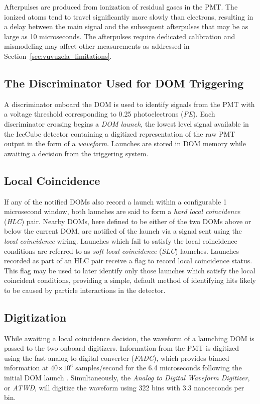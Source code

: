 Afterpulses are produced from ionization of residual gases in the PMT.
The ionized atoms tend to travel significantly more slowly than electrons, resulting in a delay between the main signal and the subsequent afterpulses that may be as large as 10 microseconds.
The afterpulses require dedicated calibration and mismodeling may affect other measurements as addressed in Section~\ref{sec:vuvuzela_limitations}.

\subsection{The Discriminator Used for DOM Triggering}
\label{ubsec:discriminator}
A discriminator onboard the DOM is used to identify signals from the PMT with a voltage threshold corresponding to 0.25 photoelectrons (\emph{PE}).
Each discriminator crossing begins a \emph{DOM launch}, the lowest level signal available in the IceCube detector containing a digitized representation of the raw PMT output in the form of a \emph{waveform}.
Launches are stored in DOM memory while awaiting a decision from the triggering system.

\subsection{Local Coincidence}
\label{subsec:LC}
If any of the notified DOMs also record a launch within a configurable 1 microsecond window, both launches are said to form a \emph{hard local coincidence} (\emph{HLC}) pair.
Nearby DOMs, here defined to be either of the two DOMs above or below the current DOM, are notified of the launch via a signal sent using the \emph{local coincidence} wiring.
Launches which fail to satisfy the local coincidence conditions are referred to as \emph{soft local coincidence} (\emph{SLC}) launches.
Launches recorded as part of an HLC pair receive a flag to record local coincidence status.
This flag may be used to later identify only those launches which satisfy the local coincident conditions, providing a simple, default method of identifying hits likely to be caused by particle interactions in the detector.

\subsection{Digitization}
\label{subsec:digitization}
While awaiting a local coincidence decision, the waveform of a launching DOM is passed to the two onboard digitizers.
Information from the PMT is digitized using the fast analog-to-digital converter (\emph{FADC}), which provides binned information at 40$\times 10^6$ samples/second for the 6.4 microseconds following the initial DOM launch \cite{Description-IceCube}.
Simultaneously, the \emph{Analog to Digital Waveform Digitizer}, or \emph{ATWD}, will digitize the waveform using 322 bins with 3.3 nanoseconds per bin. 

